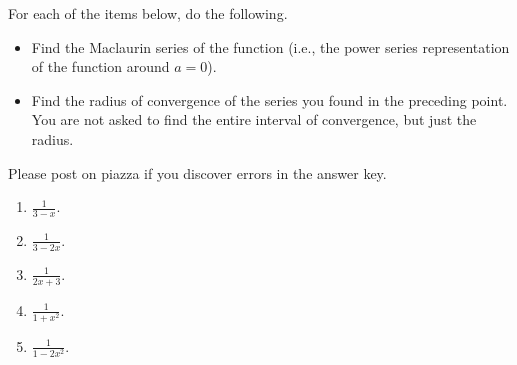 For each of the items below, do the following.
\begin{itemize}
\item Find the Maclaurin series of the function (i.e., the power series representation of the function around $a=0$).
\item Find the radius of convergence of the series you found in the preceding point. You are not asked to find the entire interval of convergence, but just the radius.
\end{itemize}
Please post on piazza if you discover errors in the answer key.
\begin{multicols}{2}
\begin{enumerate}[ref={\fcProblemRef}]
\item $\displaystyle \frac{1}{3-x}$.

\item $\displaystyle \frac{1}{3-2x}$.

\item $\displaystyle \frac{1}{2x+3}$.

\item $\displaystyle \frac{1}{1+x^2}$.

\item $\displaystyle \frac{1}{1-2x^2}$.


\end{enumerate}
\end{multicols}
